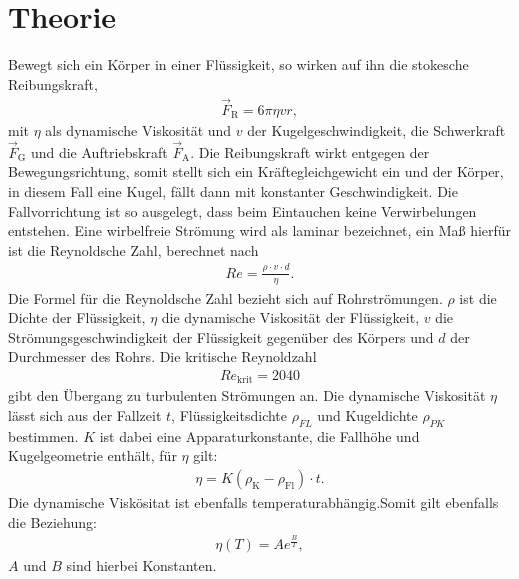 \section{Theorie}
\label{sec:theorie}
Bewegt sich ein Körper in einer Flüssigkeit, so wirken auf
ihn die stokesche Reibungskraft,
\begin{align}
  \vec{F}_{\mathrm{R}}=6\pi\eta v r,
\end{align}
mit $\eta$ als dynamische Viskosität und $v$ der Kugelgeschwindigkeit,
die Schwerkraft $\vec{F}_{\mathrm{G}}$ und die Auftriebskraft $\vec{F}_{\mathrm{A}}$.
Die Reibungskraft wirkt entgegen der Bewegungsrichtung, somit stellt sich ein
Kräftegleichgewicht ein und der Körper, in diesem Fall eine Kugel,
fällt dann mit konstanter Geschwindigkeit.
Die Fallvorrichtung ist so ausgelegt, dass beim Eintauchen
keine Verwirbelungen entstehen. Eine wirbelfreie Strömung
wird als laminar bezeichnet, ein Maß hierfür ist die Reynoldsche Zahl, berechnet nach
\begin{align}
Re=\frac{\rho \cdot v \cdot d}{\eta}\label{eqn:rey}.
\end{align}
Die Formel für die Reynoldsche Zahl bezieht sich auf Rohrströmungen.
$\rho$ ist die Dichte der Flüssigkeit, $\eta$ die dynamische Viskosität der
Flüssigkeit, $v$ die Strömungsgeschwindigkeit der Flüssigkeit
gegenüber des Körpers und $d$ der Durchmesser des Rohrs\cite{rey}.
Die kritische Reynoldzahl
\begin{align*}
Re_{\mathrm{krit}}=2040
\end{align*}
gibt den Übergang zu turbulenten Strömungen an.\cite{reykrit}
Die dynamische Viskosität $\eta$ lässt sich
aus der Fallzeit $t$, Flüssigkeitsdichte $\rho_{FL}$ und Kugeldichte $\rho_{PK}$
bestimmen. $K$ ist dabei eine  Apparaturkonstante, die Fallhöhe
und Kugelgeometrie enthält, für $\eta$ gilt:
\begin{align}
  \eta=K(\rho_\mathrm{K}-\rho_\mathrm{Fl})\cdot t \label{eqn:vis}.
\end{align}
Die dynamische Viskösitat ist ebenfalls temperaturabhängig.Somit gilt ebenfalls die Beziehung:
\begin{align}
  \eta(T)= A e^{\frac{B}{T}}\label{eqn:andra},
\end{align}
$A$ und $B$ sind hierbei Konstanten.

